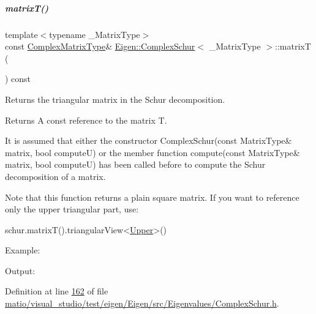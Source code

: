 \mbox{\label{group___eigenvalues___module_add3ab5ed83f7f2f06b79fa910a2d5684}} 
\subparagraph{\texorpdfstring{matrix\+T()}{matrixT()}\hspace{0.1cm}{\footnotesize\ttfamily [1/2]}}
{\footnotesize\ttfamily template$<$typename \+\_\+\+Matrix\+Type$>$ \\
const \hyperlink{group___eigenvalues___module_af61fe57877d51cfb50178f78534042f0}{Complex\+Matrix\+Type}\& \hyperlink{group___eigenvalues___module_class_eigen_1_1_complex_schur}{Eigen\+::\+Complex\+Schur}$<$ \+\_\+\+Matrix\+Type $>$\+::matrixT (\begin{DoxyParamCaption}{ }\end{DoxyParamCaption}) const\hspace{0.3cm}{\ttfamily [inline]}}



Returns the triangular matrix in the Schur decomposition. 

\begin{DoxyReturn}{Returns}
A const reference to the matrix T.
\end{DoxyReturn}
It is assumed that either the constructor Complex\+Schur(const Matrix\+Type\& matrix, bool compute\+U) or the member function compute(const Matrix\+Type\& matrix, bool compute\+U) has been called before to compute the Schur decomposition of a matrix.

Note that this function returns a plain square matrix. If you want to reference only the upper triangular part, use\+: 
\begin{DoxyCode}
schur.matrixT().triangularView<\hyperlink{group__enums_gga39e3366ff5554d731e7dc8bb642f83cda6bcb58be3b8b8ec84859ce0c5ac0aaec}{Upper}>() 
\end{DoxyCode}


Example\+: 
\begin{DoxyCodeInclude}
\end{DoxyCodeInclude}
 Output\+: 
\begin{DoxyVerbInclude}
\end{DoxyVerbInclude}
 

Definition at line \hyperlink{matio_2visual__studio_2test_2eigen_2_eigen_2src_2_eigenvalues_2_complex_schur_8h_source_l00162}{162} of file \hyperlink{matio_2visual__studio_2test_2eigen_2_eigen_2src_2_eigenvalues_2_complex_schur_8h_source}{matio/visual\+\_\+studio/test/eigen/\+Eigen/src/\+Eigenvalues/\+Complex\+Schur.\+h}.

